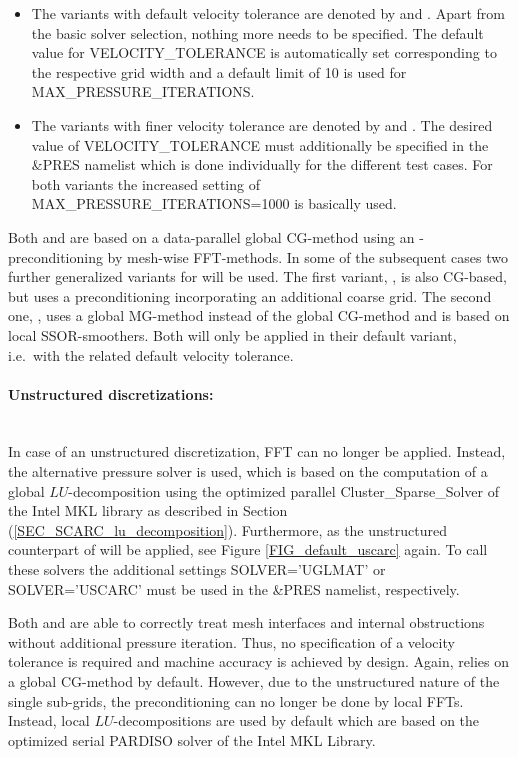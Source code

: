 \begin{itemize}
\item The variants with default velocity tolerance are denoted by \fftdefault{} and \scarcdefault{}. Apart from the basic solver selection, nothing more needs to be specified. The default value for {\ct VELOCITY\_TOLERANCE} is automatically set corresponding to the respective grid width and a default limit of 10 is used for  {\ct MAX\_PRESSURE\_ITERATIONS}. 
\item The variants with finer velocity tolerance are denoted by \ffttight{} and \scarctight{}. The desired value of {\ct VELOCITY\_TOLERANCE} must additionally be specified in the {\ct \&PRES} namelist which is done individually for the different test cases. For both variants the increased setting of {\ct MAX\_PRESSURE\_ITERATIONS=1000} is basically used.
\end{itemize}
%
Both \scarcdefault{} and \scarctight{} are based on a data-parallel global CG-method using an \ols{}-preconditioning by mesh-wise FFT-methods.
In some of the subsequent cases two further generalized variants for \scarc{} will be used. The first variant, \scarctwolevel{}, is also CG-based, but uses a \tls{} preconditioning incorporating an additional coarse grid. The second one, \scarcmultigrid{}, uses a global MG-method instead of the global CG-method and is based on local SSOR-smoothers. Both will only be applied in their default variant, i.e.\ with the related default velocity tolerance.

\paragraph{Unstructured discretizations:} \mbox{} \\[1ex]
In case of an unstructured discretization, FFT can no longer be applied. 
Instead, the alternative pressure solver \uglmat{} is used, which is based on the computation of a global $LU$-decomposition using the optimized parallel {\ct Cluster\_Sparse\_Solver} of the Intel\textsuperscript{\textregistered} MKL library as described in Section (\ref{SEC_SCARC_lu_decomposition}).
Furthermore, \uscarc{} as the unstructured counterpart of \scarc{} will be applied, see Figure \ref{FIG_default_uscarc} again.
To call these solvers the additional settings  {\ct SOLVER='UGLMAT'} or {\ct SOLVER='USCARC'} must be used in the {\ct \&PRES} namelist, respectively.

Both \uglmat{} and \uscarc{} are able to correctly treat mesh interfaces and internal obstructions without additional pressure iteration. Thus, no specification of a velocity tolerance is required and machine accuracy is achieved by design.
Again, \uscarc{} relies on a global CG-method by default. However, due to the unstructured nature of the single sub-grids, the preconditioning can no longer be done by local FFTs. Instead, local $LU$-decompositions are used by default which are based on the optimized serial {\ct PARDISO} solver of the Intel\textsuperscript{\textregistered} MKL Library. 

